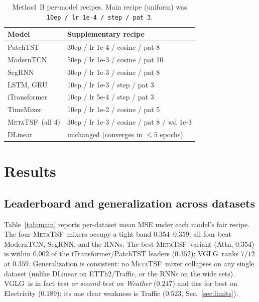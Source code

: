 \documentclass[11pt]{article}
\newcommand{\mtsf}{\textsc{MetaTSF}}
\newcommand{\vglg}{\textsc{VGLG}}
\begin{document}
\begin{table}[t]
\centering
\caption{Method~B per-model recipes. Main recipe (uniform) was
\texttt{10ep / lr 1e-4 / step / pat 3}.}
\label{tab:recipes}
\small
\begin{tabular}{@{}ll@{}}
\toprule
Model & Supplementary recipe \\
\midrule
PatchTST      & 30ep / lr 1e-4 / cosine / pat 8 \\
ModernTCN     & 50ep / lr 1e-3 / cosine / pat 10 \\
SegRNN        & 30ep / lr 1e-3 / cosine / pat 8 \\
LSTM, GRU     & 10ep / lr 1e-3 / step / pat 3 \\
iTransformer  & 10ep / lr 5e-4 / step / pat 3 \\
TimeMixer     & 10ep / lr 1e-2 / cosine / pat 5 \\
\mtsf\ (all 4)& 30ep / lr 1e-3 / cosine / pat 8 / wd 1e-3 \\
DLinear       & unchanged (converges in $\le5$ epochs) \\
\bottomrule
\end{tabular}
\end{table}

\section{Results}
\label{sec:results}

\subsection{Leaderboard and generalization across datasets}

Table~\ref{tab:main} reports per-dataset mean MSE under each model's fair recipe.
The four \mtsf\ mixers occupy a tight band $0.354$--$0.359$; all four beat
ModernTCN, SegRNN, and the RNNs. The best \mtsf\ variant (Attn, $0.354$) is within
$0.002$ of the iTransformer/PatchTST leaders ($0.352$); \vglg\ ranks $7/12$ at
$0.359$. Generalization is consistent: no \mtsf\ mixer collapses on any single
dataset (unlike DLinear on ETTh2/Traffic, or the RNNs on the wide sets). \vglg\ is
in fact \emph{best or second-best on Weather} ($0.247$) and ties for best on
Electricity ($0.189$); its one clear weakness is Traffic ($0.523$,
Sec.~\ref{sec:limits}).
\end{document}

